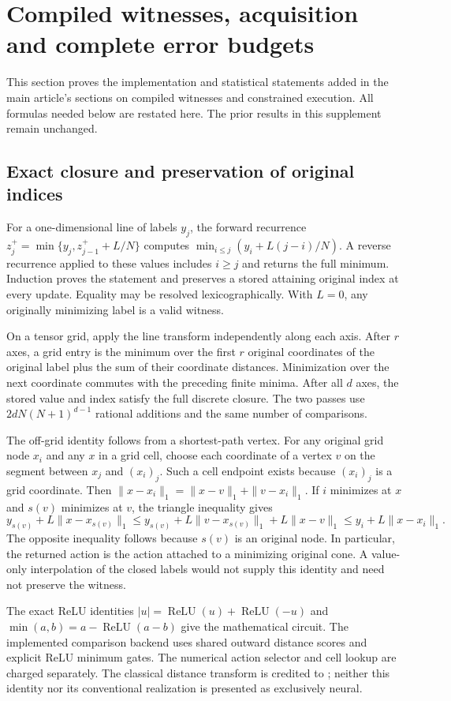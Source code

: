 \section{Compiled witnesses, acquisition and complete error budgets}\label{supp:proofs47}
This section proves the implementation and statistical statements added in the main article's sections on compiled witnesses and constrained execution. All formulas needed below are restated here. The prior results in this supplement remain unchanged.

\subsection{Exact closure and preservation of original indices}
For a one-dimensional line of labels $y_j$, the forward recurrence
$z_j^+=\min\{y_j,z_{j-1}^++L/N\}$ computes
$\min_{i\le j}(y_i+L(j-i)/N)$. A reverse recurrence applied to these values includes $i\ge j$ and returns the full minimum. Induction proves the statement and preserves a stored attaining original index at every update. Equality may be resolved lexicographically. With $L=0$, any originally minimizing label is a valid witness.

On a tensor grid, apply the line transform independently along each axis. After $r$ axes, a grid entry is the minimum over the first $r$ original coordinates of the original label plus the sum of their coordinate distances. Minimization over the next coordinate commutes with the preceding finite minima. After all $d$ axes, the stored value and index satisfy the full discrete closure. The two passes use $2dN(N+1)^{d-1}$ rational additions and the same number of comparisons.

The off-grid identity follows from a shortest-path vertex. For any original grid node $x_i$ and any $x$ in a grid cell, choose each coordinate of a vertex $v$ on the segment between $x_j$ and $(x_i)_j$. Such a cell endpoint exists because $(x_i)_j$ is a grid coordinate. Then
$\|x-x_i\|_1=\|x-v\|_1+\|v-x_i\|_1$. If $i$ minimizes at $x$ and $s(v)$ minimizes at $v$, the triangle inequality gives
\[
 y_{s(v)}+L\|x-x_{s(v)}\|_1
 \le y_{s(v)}+L\|v-x_{s(v)}\|_1+L\|x-v\|_1
 \le y_i+L\|x-x_i\|_1.
\]
The opposite inequality follows because $s(v)$ is an original node. In particular, the returned action is the action attached to a minimizing original cone. A value-only interpolation of the closed labels would not supply this identity and need not preserve the witness.

The exact ReLU identities $|u|=\operatorname{ReLU}(u)+\operatorname{ReLU}(-u)$ and $\min(a,b)=a-\operatorname{ReLU}(a-b)$ give the mathematical circuit. The implemented comparison backend uses shared outward distance scores and explicit ReLU minimum gates. The numerical action selector and cell lookup are charged separately. The classical distance transform is credited to \citet{felzenszwalb2012}; neither this identity nor its conventional realization is presented as exclusively neural.

